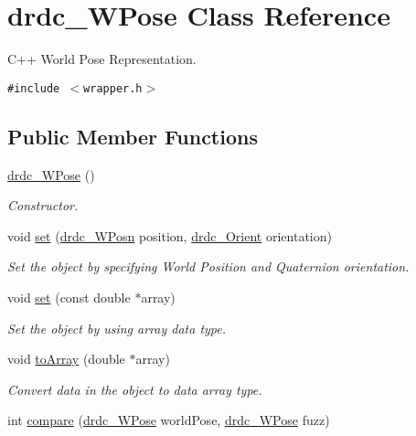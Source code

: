 \hypertarget{classdrdc__WPose}{
\section{drdc\_\-WPose Class Reference}
\label{classdrdc__WPose}
}
C++ World Pose Representation.  


{\tt \#include $<$wrapper.h$>$}

\subsection*{Public Member Functions}
\begin{CompactItemize}
\item 
\hyperlink{classdrdc__WPose_6514c2fd83bf9c7cb73bd4f1e984125b}{drdc\_\-WPose} ()
\begin{CompactList}\small\item\em Constructor. \item\end{CompactList}\item 
void \hyperlink{classdrdc__WPose_e64d64f0464aa320c73d3bea00bfd645}{set} (\hyperlink{classdrdc__WPosn}{drdc\_\-WPosn} position, \hyperlink{classdrdc__Orient}{drdc\_\-Orient} orientation)
\begin{CompactList}\small\item\em Set the object by specifying World Position and Quaternion orientation. \item\end{CompactList}\item 
void \hyperlink{classdrdc__WPose_8f6641d88dd366dfb3c6a560c11f0285}{set} (const double $\ast$array)
\begin{CompactList}\small\item\em Set the object by using array data type. \item\end{CompactList}\item 
void \hyperlink{classdrdc__WPose_93914a9d20c6e13a4a0000b7532cda59}{toArray} (double $\ast$array)
\begin{CompactList}\small\item\em Convert data in the object to data array type. \item\end{CompactList}\item 
int \hyperlink{classdrdc__WPose_f61738b76e8b0f77f72b54c118e667c4}{compare} (\hyperlink{classdrdc__WPose}{drdc\_\-WPose} worldPose, \hyperlink{classdrdc__WPose}{drdc\_\-WPose} fuzz)

\end{CompactItemize}
